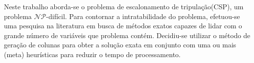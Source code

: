 Neste trabalho aborda-se o problema de escalonamento de tripula\c{c}\~ao(CSP),
um problema $\mathcal{NP}$-dif\'icil. Para contornar a intratabilidade do
problema, efetuou-se uma pesquisa na literatura em busca de m\'etodos exatos
capazes de lidar com o grande n\'umero de vari\'aveis que problema cont\'em.
Decidiu-se utilizar o m\'etodo de gera\c{c}\~ao de colunas para obter a solu\c{c}\~ao
exata em conjunto com uma ou mais (meta) heur\'isticas para reduzir o tempo de processamento.
